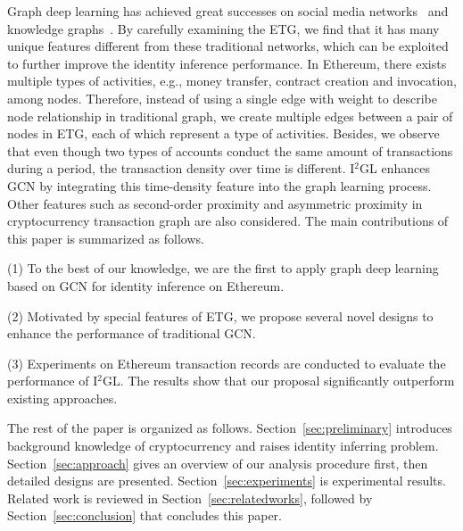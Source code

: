 Graph deep learning has achieved great successes on social media networks~\cite{geng2015learning} and knowledge graphs~\cite{bollacker2008freebase}. By carefully examining the ETG, we find that it has many unique features different from these traditional networks, which can be exploited to further improve the identity inference performance. In Ethereum, there exists multiple types of activities, e.g., money transfer, contract creation and invocation, among nodes. Therefore, instead of using a single edge with weight to describe node relationship in traditional graph, we create multiple edges between a pair of nodes in ETG, each of which represent a type of activities. Besides, we observe that even though two types of accounts conduct the same amount of transactions during a period, the transaction density over time is different. I$^2$GL enhances GCN by integrating this time-density feature into the graph learning process. Other features such as second-order proximity and asymmetric proximity in cryptocurrency transaction graph are also considered. The main contributions of this paper is summarized as follows.

(1) To the best of our knowledge, we are the first to apply graph deep learning based on GCN for identity inference on Ethereum. 

(2) Motivated by special features of ETG, we propose several novel designs to enhance the performance of traditional GCN.

(3) Experiments on Ethereum transaction records are conducted to evaluate the performance of I$^2$GL. The results show that our proposal significantly outperform existing approaches.



The rest of the paper is organized as follows. Section~\ref{sec:preliminary} introduces background knowledge of cryptocurrency and raises identity inferring problem. Section~\ref{sec:approach} gives an overview of our analysis procedure first, then detailed designs are presented. Section~\ref{sec:experiments} is experimental results.  Related work is reviewed in Section~\ref{sec:relatedworks}, followed by Section~\ref{sec:conclusion} that concludes this paper.



